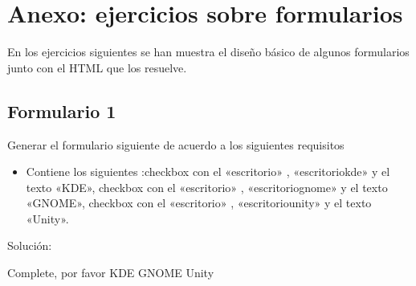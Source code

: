 \documentclass[letterpaper,10pt,spanish]{sphinxmanual}
\begin{document}
\chapter{Anexo: ejercicios sobre formularios}
\label{\detokenize{ejercicios/formularios/anexo_formularios::doc}}\label{\detokenize{ejercicios/formularios/anexo_formularios:anexo-ejercicios-sobre-formularios}}
En los ejercicios siguientes se han muestra el diseño básico de algunos formularios junto con el HTML que los resuelve.


\section{Formulario 1}
\label{\detokenize{ejercicios/formularios/anexo_formularios:formulario-1}}
Generar el formulario siguiente de acuerdo a los siguientes requisitos
\begin{itemize}
\item {} 
Contiene los siguientes :checkbox con el   «escritorio» ,   «escritoriokde»  y el texto «KDE», checkbox con el   «escritorio» ,   «escritoriognome»  y el texto «GNOME», checkbox con el   «escritorio» ,   «escritoriounity»  y el texto «Unity».

\end{itemize}


Solución:

\begin{sphinxVerbatim}[commandchars=\\\{\}]
  Complete, por favor
      KDE   
      GNOME   
      Unity   
\end{sphinxVerbatim}
\end{document}
